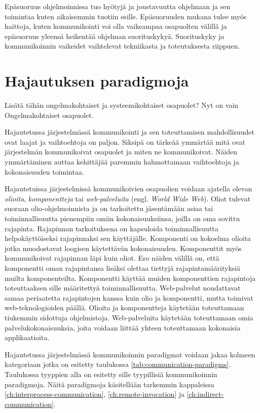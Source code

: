 Epäsuoruus ohjelmoinnissa tuo hyötyjä ja joustavuutta ohjelmaan ja sen toimintaa kuten aikaisemmin tuotiin esille. Epäsuoruuden mukana tulee myös haittoja, kuten kommunikointi voi olla vaikeampaa osapuolten välillä ja epäsuoruus yleensä heikentää ohjelman suorituskykyä. Suorituskyky ja kommunikoinnin vaikeidet vaihtelevat tekniikasta ja toteutuksesta riippuen.

\section{Hajautuksen paradigmoja}
\begin{it}
	Lisätä tähän ongelmakohtaiset ja systeemikohtaiset osapuolet? Nyt on vain Ongelmakohtaiset osapuolet.
\end{it}
Hajautetussa järjestelmässä kommunikointi ja sen toteuttamisen mahdollisuudet ovat laajat ja vaihtoehtoja on paljon. Siksipä on tärkeää ymmärtää mitä ovat järjestelmän kommunikoivat osapuolet ja miten ne kommunikoivat. Näiden ymmärtäminen auttaa kehittäjää paremmin hahmottamaan vaihtoehtoja ja kokonaisuuden toimintaa.

Hajautetuissa järjestelmissä kommunikoivien osapuolien voidaan ajatella olevan \emph{olioita}, \emph{komponentteja} tai \emph{web-palveluita} (engl. \emph{World Wide Web}). Oliot tulevat suoraan olio-ohjelmoinnista ja on tarkoitettu jäsentämään asiaa tai toiminnallisuutta pienempiin omiin kokonaisuuksiinsa, joilla on oma sovittu rajapinta. Rajapinnan tarkoituksena on kapsuloida toiminnallisuutta helpokäyttöiseksi rajapinnaksi sen käyttäjälle. Komponenti on kokoelma olioita jotka muodostavat loogisen käytettävän kokonaisuuden. Komponenttit myös kommunikoivat rajapinnan läpi kuin oliot. Ero näiden välillä on, että komponentti oman rajapintansa lisäksi olettaa tiettyjä rajapintamäärityksiä muilta komponenteilta. Komponentti käyttää muiden komponenttien rajapintoja toteuttaaksen sille määritettyä toiminnallisuutta. Web-palvelut noudattavat samaa periaatetta rajapintojen kanssa kuin olio ja komponentti, mutta toimivat web-teknologioiden päällä. Olioita ja komponentteja käytetään toteuttamaan tiukemmin sidottuja ohjelmistoja. Web-palveluita käytetään toteuttamaan omia palvelukokonaisuuksia, joita voidaan liittää yhteen toteuttamaan kokonaisia applikaatioita. \mbox{\cite[s.~42--43]{distributed-systems-concepts-and-design}}

Hajautetussa järjestelmässä kommunikoinnin paradigmat voidaan jakaa kolmeen kategoriaan jotka on esitetty taulukossa \ref{tab:communication-paradigms}. Taulukossa tyyppien alla on esitetty sille tyypillisiä kommunikoinnin paradigmoja. Näitä paradigmoja käsitellään tarkemmin kappaleissa \ref{ch:interprocess-communication}, \ref{ch:remote-invocation} ja \ref{ch:indirect-communication}.

